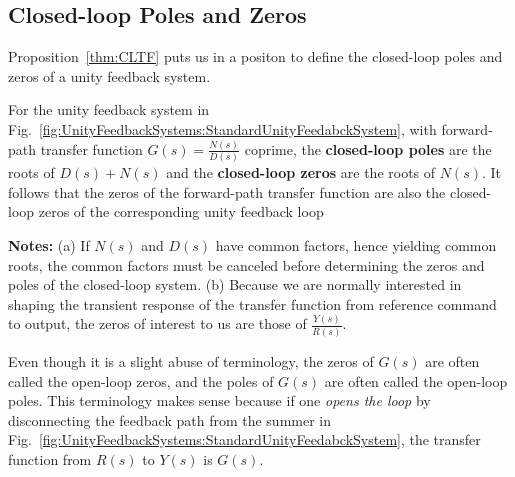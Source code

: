 \subsection{Closed-loop Poles and Zeros}

\bigskip
Proposition~\ref{thm:CLTF} puts us in a positon to define the closed-loop poles and zeros of a unity feedback system.
\bigskip

\vspace*{.2cm}

\begin{tcolorbox}[colback=mylightblue, title = {\bf Closed-Loop Poles and Zeros}, breakable]

\begin{definition} 
\label{def:ClosedLoopPolesZeros}
For the unity feedback system in Fig.~\ref{fig:UnityFeedbackSystems:StandardUnityFeedabckSystem}, with forward-path transfer function $G(s) = \frac{N(s)}{D(s)}$ coprime, the \textbf{closed-loop poles} are the roots of $D(s) + N(s)$ and the \textbf{closed-loop zeros} are the roots of $N(s)$. It follows that the zeros of the forward-path transfer function are also the closed-loop zeros of the corresponding unity feedback loop
\end{definition}

\textbf{Notes:} (a) If $N(s)$ and $D(s)$ have common factors, hence yielding common roots, the common factors must be canceled before determining the zeros and poles of the closed-loop system. (b) 
Because we are normally interested in shaping the transient response of the transfer function from reference command to output, the zeros of interest to us are those of $ \frac{Y(s)}{R(s)}$.
\end{tcolorbox}

\vspace*{.2cm}

Even though it is a slight abuse of terminology, the zeros of $G(s)$ are often called the open-loop zeros, and the poles of $G(s)$ are often called the open-loop poles. This terminology makes sense because if one \emph{opens the loop} by disconnecting the feedback path from the summer in Fig.~\ref{fig:UnityFeedbackSystems:StandardUnityFeedabckSystem}, the transfer function from $R(s)$ to $Y(s)$ is $G(s)$.

